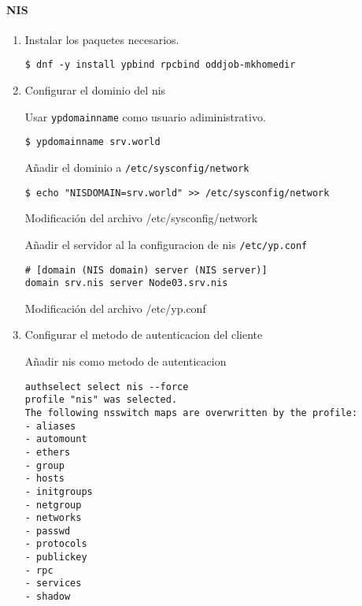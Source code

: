\documentclass[../main.tex]{subfiles}
\begin{document}
\paragraph{NIS}
\begin{enumerate}
  \item Instalar los paquetes necesarios.
        \begin{listing}[H]
\begin{verbatim}
$ dnf -y install ypbind rpcbind oddjob-mkhomedir
\end{verbatim}
        \end{listing}

  \item Configurar el dominio del \acrshort{nis}

        Usar \texttt{ypdomainname} como usuario adiministrativo.
        \begin{listing}[H]
\begin{verbatim}
$ ypdomainname srv.world
\end{verbatim}
        \end{listing}
        Añadir el dominio a \texttt{/etc/sysconfig/network}
        \begin{listing}[H]
\begin{verbatim}
$ echo "NISDOMAIN=srv.world" >> /etc/sysconfig/network
\end{verbatim}
          \label{list:sysnetwork}
          \caption{Modificación del archivo /etc/sysconfig/network}
        \end{listing}
        Añadir el servidor al la configuracion de \acrshort{nis} \texttt{/etc/yp.conf}
        \begin{listing}[H]
\begin{verbatim}
# [domain (NIS domain) server (NIS server)]
domain srv.nis server Node03.srv.nis
\end{verbatim}
          \label{list:yp}
          \caption{Modificación del archivo /etc/yp.conf}
        \end{listing}

  \item Configurar el metodo de autenticacion del cliente

        Añadir \acrshort{nis} como metodo de autenticacion

        \begin{listing}[H]
\begin{verbatim}
authselect select nis --force
profile "nis" was selected.
The following nsswitch maps are overwritten by the profile:
- aliases
- automount
- ethers
- group
- hosts
- initgroups
- netgroup
- networks
- passwd
- protocols
- publickey
- rpc
- services
- shadow


\end{verbatim}
\end{listing}
\end{enumerate}
\end{document}
